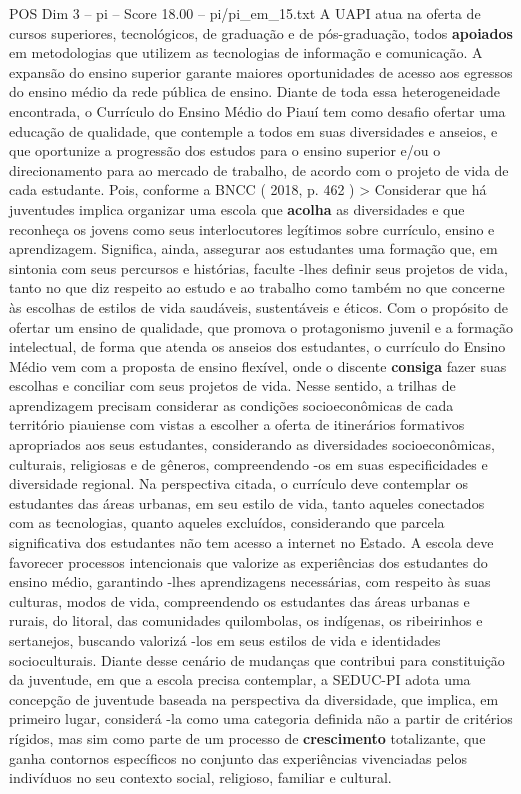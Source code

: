 \begin{textsample}{POS Dim 3 – pi – Score 18.00 – pi/pi\_em\_15.txt}
A UAPI atua na oferta de cursos superiores, tecnológicos, de graduação e de pós-graduação, todos \textbf{apoiados} em metodologias que utilizem as tecnologias de informação e comunicação.
A expansão do ensino superior garante maiores oportunidades de acesso aos egressos do ensino médio da rede pública de ensino.
Diante de toda essa heterogeneidade encontrada, o Currículo do Ensino Médio do Piauí tem como desafio ofertar uma educação de qualidade, que contemple a todos em suas diversidades e anseios, e que oportunize a progressão dos estudos para o ensino superior e/ou o direcionamento para ao mercado de trabalho, de acordo com o projeto de vida de cada estudante.
Pois, conforme a BNCC ( 2018, p. 462 ) > Considerar que há juventudes implica organizar uma escola que \textbf{acolha} as diversidades e que reconheça os jovens como seus interlocutores legítimos sobre currículo, ensino e aprendizagem.
Significa, ainda, assegurar aos estudantes uma formação que, em sintonia com seus percursos e histórias, faculte -lhes definir seus projetos de vida, tanto no que diz respeito ao estudo e ao trabalho como também no que concerne às escolhas de estilos de vida saudáveis, sustentáveis e éticos.
Com o propósito de ofertar um ensino de qualidade, que promova o protagonismo juvenil e a formação intelectual, de forma que atenda os anseios dos estudantes, o currículo do Ensino Médio vem com a proposta de ensino flexível, onde o discente \textbf{consiga} fazer suas escolhas e conciliar com seus projetos de vida.
Nesse sentido, a trilhas de aprendizagem precisam considerar as condições socioeconômicas de cada território piauiense com vistas a escolher a oferta de itinerários formativos apropriados aos seus estudantes, considerando as diversidades socioeconômicas, culturais, religiosas e de gêneros, compreendendo -os em suas especificidades e diversidade regional.
Na perspectiva citada, o currículo deve contemplar os estudantes das áreas urbanas, em seu estilo de vida, tanto aqueles conectados com as tecnologias, quanto aqueles excluídos, considerando que parcela significativa dos estudantes não tem acesso a internet no Estado.
A escola deve favorecer processos intencionais que valorize as experiências dos estudantes do ensino médio, garantindo -lhes aprendizagens necessárias, com respeito às suas culturas, modos de vida, compreendendo os estudantes das áreas urbanas e rurais, do litoral, das comunidades quilombolas, os indígenas, os ribeirinhos e sertanejos, buscando valorizá -los em seus estilos de vida e identidades socioculturais.
Diante desse cenário de mudanças que contribui para constituição da juventude, em que a escola precisa contemplar, a SEDUC-PI adota uma concepção de juventude baseada na perspectiva da diversidade, que implica, em primeiro lugar, considerá -la como uma categoria definida não a partir de critérios rígidos, mas sim como parte de um processo de \textbf{crescimento} totalizante, que ganha contornos específicos no conjunto das experiências vivenciadas pelos indivíduos no seu contexto social, religioso, familiar e cultural.

\end{textsample}
